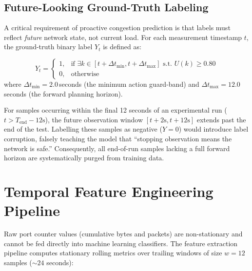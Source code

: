 \subsection{Future-Looking Ground-Truth Labeling}
A critical requirement of proactive congestion prediction is that labels must reflect \textit{future} network state, not current load. For each measurement timestamp $t$, the ground-truth binary label $Y_t$ is defined as:

\begin{equation}
  Y_t = \begin{cases} 
    1, & \text{if } \exists k \in [t + \Delta t_{\text{min}}, t + \Delta t_{\text{max}}] \text{ s.t. } U(k) \ge 0.80 \\
    0, & \text{otherwise}
  \end{cases}
\end{equation}
where $\Delta t_{\text{min}} = 2.0$\,seconds (the minimum action guard-band) and $\Delta t_{\text{max}} = 12.0$\,seconds (the forward planning horizon). 

\begin{infobox}
For samples occurring within the final 12 seconds of an experimental run ($t > T_{\text{end}} - 12\text{s}$), the future observation window $[t+2\text{s}, t+12\text{s}]$ extends past the end of the test. Labelling these samples as negative ($Y=0$) would introduce label corruption, falsely teaching the model that ``stopping observation means the network is safe.'' Consequently, all end-of-run samples lacking a full forward horizon are systematically purged from training data.
\end{infobox}

\section{Temporal Feature Engineering Pipeline}
Raw port counter values (cumulative bytes and packets) are non-stationary and cannot be fed directly into machine learning classifiers. The feature extraction pipeline computes stationary rolling metrics over trailing windows of size $w=12$ samples ($\sim 24$ seconds):

